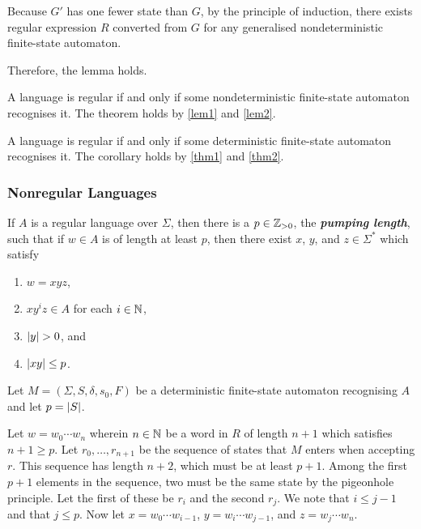    Because \(G'\) has one fewer state than \(G\), by the principle of
    induction, there exists regular expression \(R\) converted from \(G\) for
    any generalised nondeterministic finite-state automaton.

    Therefore, the lemma holds.
\Epr

\Bth
    \label{thm2}
    A language is regular if and only if some nondeterministic finite-state
    automaton recognises it.
\Eth
\Bpr
    The theorem holds by \autoref{lem1} and \autoref{lem2}.
\Epr

\Bcr
    A language is regular if and only if some deterministic finite-state
    automaton recognises it.
\Ecr
\Bpr
    The corollary holds by \autoref{thm1} and \autoref{thm2}.
\Epr

\subsubsection{Nonregular Languages}

    If \(A\) is a regular language over \(\Sigma\), then there is a \(p \in
    \mathbb{Z}_{>0}\), the \textbf{\textit{pumping length}}, such that if \(w \in A\) is
    of length at least \(p\), then there exist \(x\), \(y\), and \(z \in
    \Sigma^*\) which satisfy
    \begin{enumerate}
        \item \(w = x y z\),
        \item \(x y^i z \in A\) for each \(i \in \mathbb{N}\),
        \item \(\lvert y\rvert > 0\), and
        \item \(\lvert x y \rvert \leq p\).
    \end{enumerate}
\Eth
\Bpr
    Let \(M = (\Sigma, S, \delta, s_0, F)\) be a deterministic finite-state
    automaton recognising \(A\) and let \(p = \lvert S\rvert\).

    Let \(w = w_0 \cdots w_n\) wherein \(n \in \mathbb{N}\) be a word in \(R\) of
    length \(n + 1\) which satisfies \(n + 1 \geq p\). Let \(r_0, \ldots, r_{n +
    1}\) be the sequence of states that \(M\) enters when accepting \(r\). This
    sequence has length \(n + 2\), which must be at least \(p + 1\). Among the
    first \(p + 1\) elements in the sequence, two must be the same state by the
    pigeonhole principle. Let the first of these be \(r_i\) and the second
    \(r_j\). We note that \(i \leq j - 1\) and that \(j \leq p\). Now let \(x =
    w_0 \cdots w_{i - 1}\), \(y = w_i \cdots w_{j - 1}\), and \(z = w_j \cdots
    w_n\).

